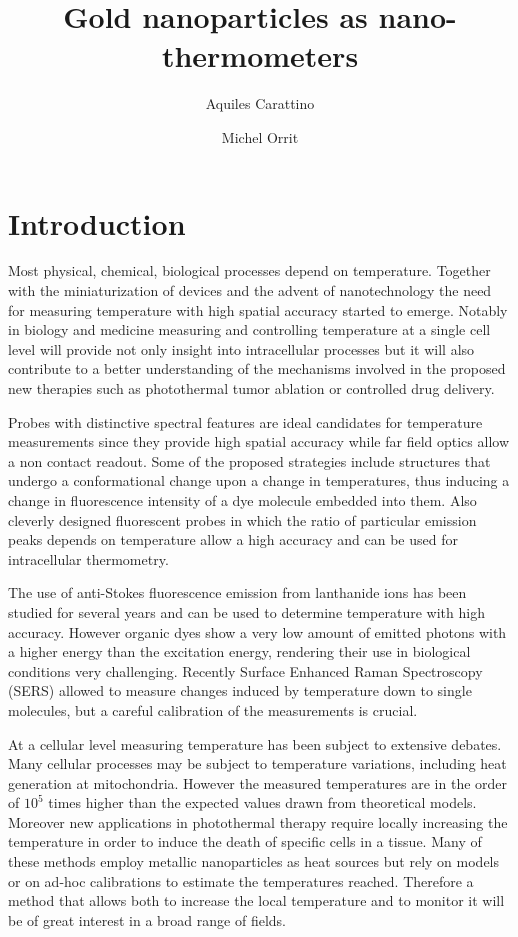 \documentclass[journal=nalefd,manuscript=letter]{achemso}
\author{Aquiles Carattino}
\affiliation[Leiden]
{Huygens-Kamerlingh Onnes Lab, 2300RA Leiden, The Netherlands}
\author{Michel Orrit}
\affiliation[Leiden]
{Huygens-Kamerlingh Onnes Lab, 2300RA Leiden, The Netherlands}
\title{Gold nanoparticles as nano-thermometers}
\begin{document}
\maketitle
{}
\section{Introduction}
Most physical, chemical, biological processes depend on temperature. Together
with the miniaturization of devices and the advent of nanotechnology the need
for measuring temperature with high spatial accuracy started to emerge. Notably
in biology\cite{Yang2011a,Hrelescu2010} and medicine\cite{Li2013c}
measuring and controlling temperature at a single cell level will provide not only insight into
intracellular processes but it will also contribute to a better understanding of
the mechanisms involved in the proposed new therapies such as photothermal tumor
ablation\cite{Gobin2007} or controlled drug
delivery\cite{Huang2006}\cite{Huo2014}.

Probes with distinctive spectral features are ideal candidates for temperature
measurements since they provide high spatial accuracy while far field optics
allow a non contact readout. Some of the proposed strategies include structures
that undergo a conformational change upon a change in
temperatures\cite{Ebrahimi2014}, thus inducing a change in fluorescence
intensity of a dye molecule embedded into them. Also cleverly designed
fluorescent probes\cite{Vetrone2010} in which the ratio of particular emission
peaks depends on temperature allow a high accuracy and can be used for
intracellular thermometry.

The use of anti-Stokes fluorescence emission from lanthanide ions has been
studied for several years\cite{Auzel2004a} and can be used to determine
temperature with high accuracy. However organic dyes show a very low amount of
emitted photons with a higher energy than the excitation energy, rendering their
use in biological conditions very challenging. Recently Surface Enhanced Raman
Spectroscopy (SERS) allowed to measure changes induced by temperature down
to single molecules\cite{Pozzi2015}, but a careful calibration of the
measurements is crucial.

At a cellular level measuring temperature has been subject to extensive
debates\cite{Yang2011a,Suzuki2015}. Many cellular processes may be subject to
temperature variations, including heat generation at mitochondria. However the
measured temperatures\cite{Yang2011} are in the order of $10^5$ times higher
than the expected values drawn from theoretical models\cite{Sato2014}.
Moreover new applications in photothermal therapy require locally increasing the
temperature in order to induce the death of specific cells in a
tissue\cite{Huang2008,Huang2006}. Many of these methods employ metallic
nanoparticles as heat sources\cite{Gobin2007,Hirsch2003} but rely on
models\cite{Zhao2014a} or on ad-hoc calibrations to estimate the temperatures
reached\cite{Donner2013}. Therefore a method that allows both to increase the
local temperature and to monitor it will be of great interest in a broad range
of fields.
\end{document}
